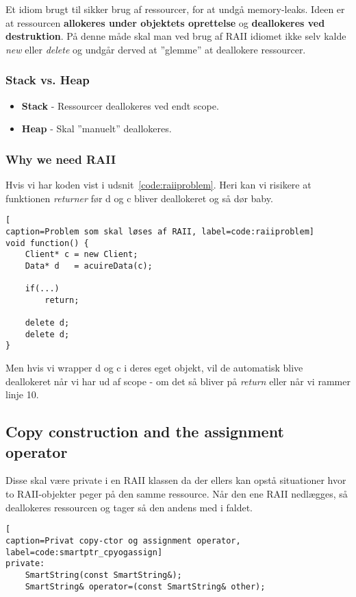 Et idiom brugt til sikker brug af ressourcer, for at undgå memory-leaks. Ideen er at ressourcen \textbf{allokeres under objektets oprettelse} og \textbf{deallokeres ved destruktion}. På denne måde skal man ved brug af RAII idiomet ikke selv kalde \textit{new} eller \textit{delete} og undgår derved at ''glemme'' at deallokere ressourcer.

\subsubsection{Stack vs. Heap}
\begin{itemize}
	\item \textbf{Stack} - Ressourcer deallokeres ved endt scope.
	\item \textbf{Heap} - Skal ''manuelt'' deallokeres.
\end{itemize}

\subsubsection{Why we need RAII}
Hvis vi har koden vist i udsnit~\ref{code:raiiproblem}. Heri kan vi risikere at funktionen \textit{returner} før d og c bliver deallokeret og så dør baby.

\begin{minipage}{\linewidth}
\begin{lstlisting}[
caption=Problem som skal løses af RAII, label=code:raiiproblem]
void function() {
	Client* c = new Client;
	Data* d   = acuireData(c);
	
	if(...)
		return;
	
	delete d;
	delete d; 
}
\end{lstlisting}
\end{minipage}

Men hvis vi wrapper d og c i deres eget objekt, vil de automatisk blive deallokeret når vi har ud af scope - om det så bliver på \textit{return} eller når vi rammer linje 10.

\subsection{Copy construction and the assignment operator}
Disse skal være private i en RAII klassen da der ellers kan opstå situationer hvor to RAII-objekter peger på den samme ressource. 
Når den ene RAII nedlægges, så deallokeres ressourcen og tager så den andens med i faldet.

\begin{lstlisting}[
caption=Privat copy-ctor og assignment operator,
label=code:smartptr_cpyogassign]
private:
	SmartString(const SmartString&);
	SmartString& operator=(const SmartString& other);
\end{lstlisting}

